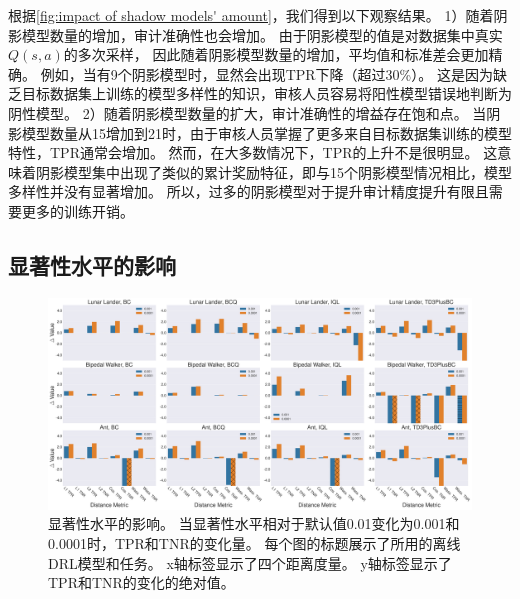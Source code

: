 根据\autoref{fig:impact of shadow models' amount}，我们得到以下观察结果。
1）随着阴影模型数量的增加，审计准确性也会增加。
由于阴影模型的值是对数据集中真实$Q\left(s, a\right)$的多次采样，
因此随着阴影模型数量的增加，平均值和标准差会更加精确。
例如，当有9个阴影模型时，\sysnameo 显然会出现TPR下降（超过30\%）。
这是因为缺乏目标数据集上训练的模型多样性的知识，审核人员容易将阳性模型错误地判断为阴性模型。
2）随着阴影模型数量的扩大，审计准确性的增益存在饱和点。
当阴影模型数量从15增加到21时，由于审核人员掌握了更多来自目标数据集训练的模型特性，TPR通常会增加。
然而，在大多数情况下，TPR的上升不是很明显。
这意味着阴影模型集中出现了类似的累计奖励特征，即与15个阴影模型情况相比，模型多样性并没有显著增加。
所以，过多的阴影模型对于提升审计精度提升有限且需要更多的训练开销。



\subsection{显著性水平的影响} 
\label{sec:impact of significance level}

\begin{figure}[!ht]
    \centering
    \includegraphics[width=\hsize]{figure/orl_auditor/overall_result_20230130210458739-sigma.pdf}
    \caption{
    显著性水平的影响。
    当显著性水平相对于默认值0.01变化为0.001和0.0001时，TPR和TNR的变化量。
    每个图的标题展示了所用的离线DRL模型和任务。
    x轴标签显示了四个距离度量。
    y轴标签显示了TPR和TNR的变化的绝对值。
    }
    \label{fig:impact of significance level}
\end{figure}

